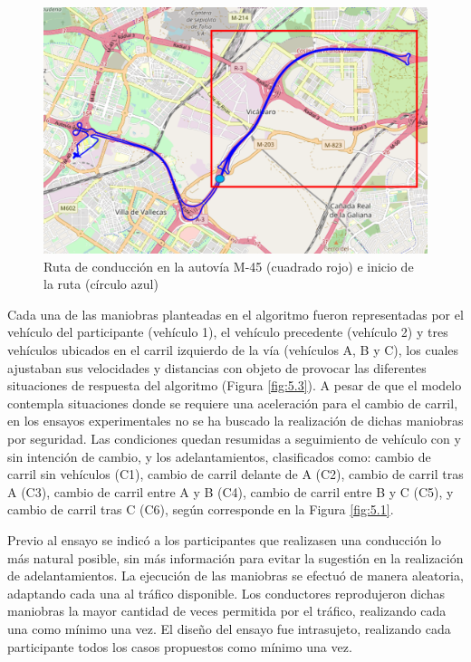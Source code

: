 \begin{figure}[h]
    \centering
    \includegraphics[width=12cm]
    {figures/5.4.png}
    \caption{ \label{fig:5.4} Ruta de conducción en la autovía M-45 (cuadrado rojo) e inicio de la ruta (círculo azul)}
\end{figure}

Cada una de las maniobras planteadas en el algoritmo fueron representadas por el vehículo del participante (vehículo 1), el vehículo precedente (vehículo 2) y tres vehículos ubicados en el carril izquierdo de la vía (vehículos A, B y C), los cuales ajustaban sus velocidades y distancias con objeto de provocar las diferentes situaciones de respuesta del algoritmo (Figura \ref{fig:5.3}). A pesar de que el modelo contempla situaciones donde se requiere una aceleración para el cambio de carril, en los ensayos experimentales no se ha buscado la realización de dichas maniobras por seguridad. Las condiciones quedan resumidas a seguimiento de vehículo con y sin intención de cambio, y los adelantamientos, clasificados como: cambio de carril sin vehículos (C1), cambio de carril delante de A (C2), cambio de carril tras A (C3), cambio de carril entre A y B (C4), cambio de carril entre B y C (C5), y cambio de carril tras C (C6), según corresponde en la Figura \ref{fig:5.1}.

Previo al ensayo se indicó a los participantes que realizasen una conducción lo más natural posible, sin más información para evitar la sugestión en la realización de adelantamientos. La ejecución de las maniobras se efectuó de manera aleatoria, adaptando cada una al tráfico disponible. Los conductores reprodujeron dichas maniobras la mayor cantidad de veces permitida por el tráfico, realizando cada una como mínimo una vez. El diseño del ensayo fue intrasujeto, realizando cada participante todos los casos propuestos como mínimo una vez.

